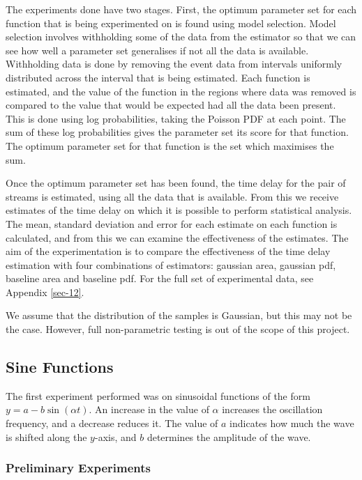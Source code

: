 \documentclass[a4paper,11pt]{article}
\begin{document}
The experiments done have two stages. First, the optimum parameter set for each
function that is being experimented on is found using model selection. Model
selection involves withholding some of the data from the estimator so that we
can see how well a parameter set generalises if not all the data is
available. Withholding data is done by removing the event data from intervals
uniformly distributed across the interval that is being estimated. Each function
is estimated, and the value of the function in the regions where data was
removed is compared to the value that would be expected had all the data been
present. This is done using log probabilities, taking the Poisson PDF at each
point. The sum of these log probabilities gives the parameter set its score for
that function. The optimum parameter set for that function is the set which
maximises the sum.

Once the optimum parameter set has been found, the time delay
for the pair of streams is estimated, using all the data that is available. From
this we receive estimates of the time delay on which it is possible to perform
statistical analysis. The mean, standard deviation and error for each estimate
on each function is calculated, and from this we can examine the effectiveness
of the estimates. The aim of the experimentation is to compare the effectiveness
of the time delay estimation with four combinations of estimators: gaussian
area, gaussian pdf, baseline area and baseline pdf. For the full set of
experimental data, see Appendix \ref{sec-12}.

We assume that the distribution of the samples is Gaussian, but this may not be
the case. However, full non-parametric testing is out of the scope of this project.
\subsection{Sine Functions}
\label{sec-8-1}

The first experiment performed was on sinusoidal functions of the form
$y=a-b\sin(\alpha t)$. An increase in the value of $\alpha$ increases the
oscillation frequency, and a decrease reduces it. The value of $a$ indicates how
much the wave is shifted along the $y$-axis, and $b$ determines the
amplitude of the wave.
\subsubsection{Preliminary Experiments}
\label{sec-8-1-1}
\end{document}
